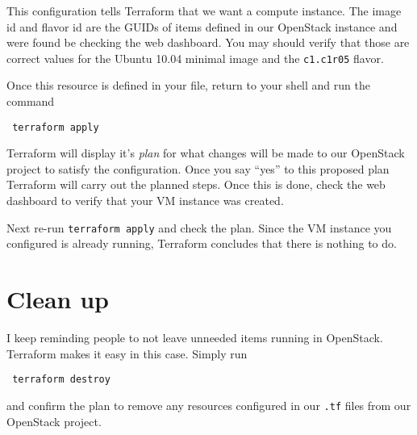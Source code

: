 \documentclass{article}
\begin{document}
This configuration tells Terraform that we want a compute instance. The image id and flavor id are the GUIDs
of items defined in our OpenStack instance and were found be checking the web dashboard. You may 
should verify that those are correct values for the Ubuntu 10.04 minimal image and the \texttt{c1.c1r05}
flavor.

Once this resource is defined in your file, return to your shell and run the command

\begin{verbatim}
 terraform apply
\end{verbatim}

Terraform will display it's \emph{plan} for what changes will be made to our OpenStack project
to satisfy the configuration. Once you say ``yes'' to this proposed plan Terraform will carry out 
the planned steps. Once this is done, check the web dashboard to verify that your VM instance
was created.

Next re-run \texttt{terraform apply} and check the plan. Since the VM instance you configured is already
running, Terraform concludes that there is nothing to do.

\section{Clean up}
I keep reminding people to not leave unneeded items running in OpenStack. Terraform makes it easy in this case.
Simply run 

\begin{verbatim}
 terraform destroy
\end{verbatim}

and confirm the plan to remove any resources configured in our \texttt{.tf} files from our
OpenStack project.
\end{document}

